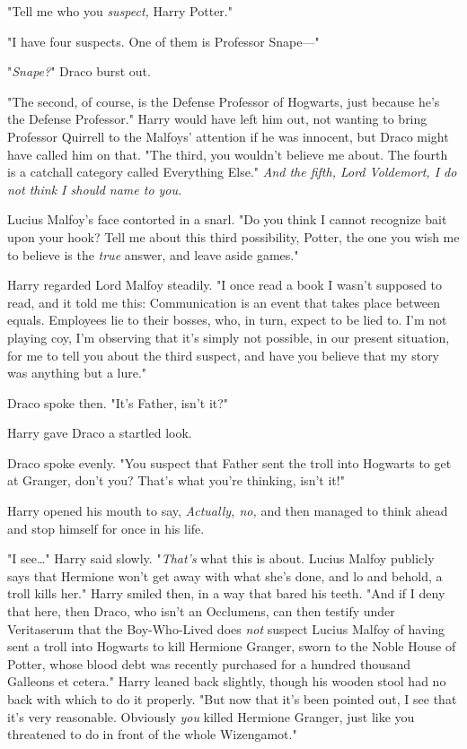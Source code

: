 "Tell me who you \emph{suspect,} Harry Potter."

"I have four suspects. One of them is Professor Snape---"

"\emph{Snape?}" Draco burst out.

"The second, of course, is the Defense Professor of Hogwarts, just because he's 
the Defense Professor." Harry would have left him out, not wanting to bring 
Professor Quirrell to the Malfoys' attention if he was innocent, but Draco 
might have called him on that. "The third, you wouldn't believe me about. The 
fourth is a catchall category called Everything Else." \emph{And the fifth, 
Lord Voldemort, I do not think I should name to you.}

Lucius Malfoy's face contorted in a snarl. "Do you think I cannot recognize 
bait upon your hook? Tell me about this third possibility, Potter, the one you 
wish me to believe is the \emph{true} answer, and leave aside games."

Harry regarded Lord Malfoy steadily. "I once read a book I wasn't supposed to 
read, and it told me this: Communication is an event that takes place between 
equals. Employees lie to their bosses, who, in turn, expect to be lied to. I'm 
not playing coy, I'm observing that it's simply not possible, in our present 
situation, for me to tell you about the third suspect, and have you believe 
that my story was anything but a lure."

Draco spoke then. "It's Father, isn't it?"

Harry gave Draco a startled look.

Draco spoke evenly. "You suspect that Father sent the troll into Hogwarts to 
get at Granger, don't you? That's what you're thinking, isn't it!"

Harry opened his mouth to say, \emph{Actually, no,} and then managed to think 
ahead and stop himself for once in his life.

"I see{\ldots}" Harry said slowly. "\emph{That's} what this is about. Lucius 
Malfoy publicly says that Hermione won't get away with what she's done, and lo 
and behold, a troll kills her." Harry smiled then, in a way that bared his 
teeth. "And if I deny that here, then Draco, who isn't an Occlumens, can then 
testify under Veritaserum that the Boy-Who-Lived does \emph{not} suspect Lucius 
Malfoy of having sent a troll into Hogwarts to kill Hermione Granger, sworn to 
the Noble House of Potter, whose blood debt was recently purchased for a 
hundred thousand Galleons et cetera." Harry leaned back slightly, though his 
wooden stool had no back with which to do it properly. "But now that it's been 
pointed out, I see that it's very reasonable. Obviously \emph{you} killed 
Hermione Granger, just like you threatened to do in front of the whole 
Wizengamot."

